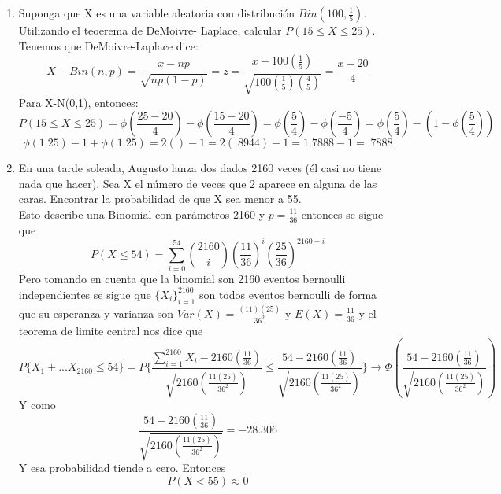 \documentclass[11pt,a4paper]{report}
\begin{document}
\begin{enumerate}
{\begin{enumerate}
		    \end{enumerate}
		}

		\item{
		Suponga que X es una variable aleatoria con distribución $Bin(100,\frac{1}{5})$. Utilizando el teoerema de DeMoivre-
		Laplace, calcular $P(15\leq X \leq 25)$. \\
		Tenemos que DeMoivre-Laplace dice:
		\[X-Bin(n,p) =\frac{x-np}{\sqrt{np(1-p)}} = z = \frac{x - 100(\frac{1}{5})}{\sqrt{100(\frac{1}{5})(\frac{4}{5})}} =
		\frac{x - 20}{4}\]
		Para X-N(0,1), entonces:
		\[P(15 \leq X \leq 25) = \phi(\frac{25 - 20}{4}) - \phi(\frac{15 - 20}{4})  =
		\phi(\frac{5}{4}) - \phi(\frac{-5}{4}) = \phi(\frac{5}{4}) - (1 - \phi(\frac{5}{4}))\]
		\[\phi(1.25) - 1 + \phi(1.25) = 2( ) - 1 = 2(.8944) - 1 = 1.7888 - 1 = .7888\]
		}

		\item{
            En una tarde soleada, Augusto lanza dos dados 2160 veces (él casi no tiene nada que hacer). Sea X el número de veces que 2 aparece en alguna de las caras. Encontrar la probabilidad de que X sea menor a 55. \\            Esto describe una Binomial con parámetros 2160 y $p=\frac{11}{36}$ entonces se sigue que $$P(X\leq 54)= \sum_{i=0}^{54}\binom{2160}{i}(\frac{11}{36})^i(\frac{25}{36})^{2160-i}$$
            Pero tomando en cuenta que la binomial son 2160 eventos bernoulli independientes se sigue que $\lbrace X_{i} \rbrace _{i=1}^{2160}$ son todos eventos bernoulli de forma que su esperanza y varianza son $Var(X)=\frac{(11)(25)}{36^2}$ y $E(X)=\frac{11}{36}$ y el teorema de limite central nos dice que 
            $$P\lbrace  X_{1}+...X_{2160}\leq 54 \rbrace = P\lbrace \frac{\sum_{i=1}^{2160}X_{i} -2160(\frac{11}{36})}{\sqrt{2160(\frac{11(25)}{36^2})}}\leq \frac{54-2160(\frac{11}{36})}{\sqrt{2160(\frac{11(25)}{36^2})}}\rbrace \rightarrow \Phi(\frac{54-2160(\frac{11}{36})}{\sqrt{2160(\frac{11(25)}{36^2})}})$$
            Y como
            $$\frac{54-2160(\frac{11}{36})}{\sqrt{2160(\frac{11(25)}{36^2})}}=-28.306$$
            Y esa probabilidad tiende a cero. Entonces $$P(X<55)\approx 0$$
		}


\end{enumerate}
\end{document}
